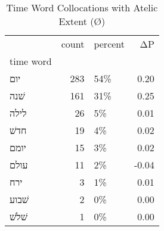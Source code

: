 \begin{table}[htbp!]
\centering
\caption{Time Word Collocations with Atelic Extent (Ø)}
\label{table:atelØ_head_cpd}
\begin{tabular}{lrlr}
\toprule
{} &  count & percent &    ΔP \\
time word &        &         &       \\
\midrule
יום       &    283 &     54\% &  0.20 \\
שׁנה      &    161 &     31\% &  0.25 \\
לילה      &     26 &      5\% &  0.01 \\
חדשׁ      &     19 &      4\% &  0.02 \\
יומם      &     15 &      3\% &  0.02 \\
עולם      &     11 &      2\% & -0.04 \\
ירח       &      3 &      1\% &  0.01 \\
שׁבוע     &      2 &      0\% &  0.00 \\
שׁלשׁ     &      1 &      0\% &  0.00 \\
\bottomrule
\end{tabular}
\end{table}
